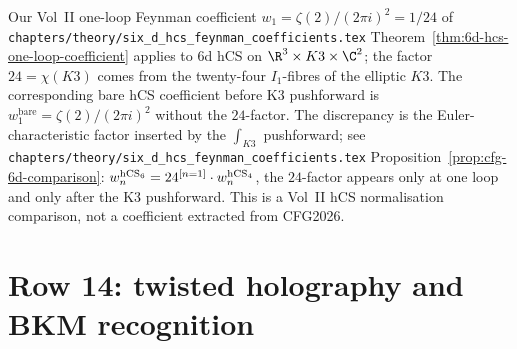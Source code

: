 \begin{remark}
\label{rem:cfg-row-13-feynman}
Our Vol~II one-loop Feynman coefficient
$w_1 = \zeta(2)/(2\pi i)^2 = 1/24$ of
\texttt{chapters/theory/six\_d\_hcs\_feynman\_coefficients.tex}
Theorem~\ref{thm:6d-hcs-one-loop-coefficient} applies to 6d hCS on
$\R^3\times K3\times \C^2$; the factor $24 = \chi(K3)$ comes from the
twenty-four $I_1$-fibres of the elliptic $K3$. The corresponding
bare hCS coefficient before K3 pushforward is
$w_1^{\mathrm{bare}} = \zeta(2)/(2\pi i)^2$ without the $24$-factor.
The discrepancy is the Euler-characteristic factor inserted by the
$\int_{K3}$ pushforward; see
\texttt{chapters/theory/six\_d\_hcs\_feynman\_coefficients.tex}
Proposition~\ref{prop:cfg-6d-comparison}:
$w_n^{\mathrm{hCS}_6} = 24^{[n=1]}\cdot w_n^{\mathrm{hCS}_4}$, the $24$-factor
appears only at one loop and only after the K3 pushforward. This is a
Vol~II hCS normalisation comparison, not a coefficient extracted from
CFG2026.
\end{remark}

\section{Row 14: twisted holography and BKM recognition}
\label{sec:cfg-row-14-bkm}

